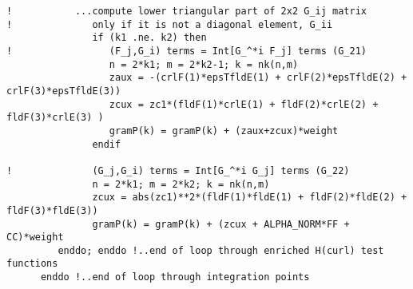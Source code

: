 \begin{lstlisting}[mathescape,caption=\file{MAXWELL/ULTRAWEAK\_DPG/}\routine{elem\_maxwell}: element integration]
!           ...compute lower triangular part of 2x2 G_ij matrix
!              only if it is not a diagonal element, G_ii
               if (k1 .ne. k2) then
!                 (F_j,G_i) terms = Int[G_^*i F_j] terms (G_21)
                  n = 2*k1; m = 2*k2-1; k = nk(n,m)
                  zaux = -(crlF(1)*epsTfldE(1) + crlF(2)*epsTfldE(2) + crlF(3)*epsTfldE(3))
                  zcux = zc1*(fldF(1)*crlE(1) + fldF(2)*crlE(2) + fldF(3)*crlE(3) )
                  gramP(k) = gramP(k) + (zaux+zcux)*weight
               endif

!              (G_j,G_i) terms = Int[G_^*i G_j] terms (G_22)
               n = 2*k1; m = 2*k2; k = nk(n,m)
               zcux = abs(zc1)**2*(fldF(1)*fldE(1) + fldF(2)*fldE(2) + fldF(3)*fldE(3))
               gramP(k) = gramP(k) + (zcux + ALPHA_NORM*FF + CC)*weight
         enddo; enddo !..end of loop through enriched H(curl) test functions
      enddo !..end of loop through integration points
\end{lstlisting}


